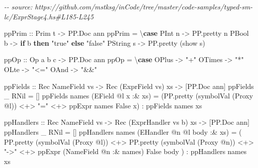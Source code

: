 \documentclass[]{article}
\newenvironment{Shaded}{}{}
\newcommand{\CommentTok}[1]{\textcolor[rgb]{0.38,0.63,0.69}{\textit{#1}}}
\newcommand{\DataTypeTok}[1]{\textcolor[rgb]{0.56,0.13,0.00}{#1}}
\newcommand{\FunctionTok}[1]{\textcolor[rgb]{0.02,0.16,0.49}{#1}}
\newcommand{\KeywordTok}[1]{\textcolor[rgb]{0.00,0.44,0.13}{\textbf{#1}}}
\newcommand{\NormalTok}[1]{#1}
\newcommand{\OperatorTok}[1]{\textcolor[rgb]{0.40,0.40,0.40}{#1}}
\newcommand{\OtherTok}[1]{\textcolor[rgb]{0.00,0.44,0.13}{#1}}
\newcommand{\StringTok}[1]{\textcolor[rgb]{0.25,0.44,0.63}{#1}}
\begin{document}
\begin{Shaded}
\begin{Highlighting}[]
\CommentTok{{-}{-} source: https://github.com/mstksg/inCode/tree/master/code{-}samples/typed{-}sm{-}lc/ExprStage4.hs\#L185{-}L245}

\OtherTok{ppPrim ::} \DataTypeTok{Prim}\NormalTok{ t }\OtherTok{{-}\textgreater{}} \DataTypeTok{PP.Doc}\NormalTok{ ann}
\NormalTok{ppPrim }\OtherTok{=}\NormalTok{ \textbackslash{}}\KeywordTok{case}
  \DataTypeTok{PInt}\NormalTok{ n }\OtherTok{{-}\textgreater{}}\NormalTok{ PP.pretty n}
  \DataTypeTok{PBool}\NormalTok{ b }\OtherTok{{-}\textgreater{}} \KeywordTok{if}\NormalTok{ b }\KeywordTok{then} \StringTok{"true"} \KeywordTok{else} \StringTok{"false"}
  \DataTypeTok{PString}\NormalTok{ s }\OtherTok{{-}\textgreater{}}\NormalTok{ PP.pretty (}\FunctionTok{show}\NormalTok{ s)}

\OtherTok{ppOp ::} \DataTypeTok{Op}\NormalTok{ a b c }\OtherTok{{-}\textgreater{}} \DataTypeTok{PP.Doc}\NormalTok{ ann}
\NormalTok{ppOp }\OtherTok{=}\NormalTok{ \textbackslash{}}\KeywordTok{case}
  \DataTypeTok{OPlus} \OtherTok{{-}\textgreater{}} \StringTok{"+"}
  \DataTypeTok{OTimes} \OtherTok{{-}\textgreater{}} \StringTok{"*"}
  \DataTypeTok{OLte} \OtherTok{{-}\textgreater{}} \StringTok{"\textless{}="}
  \DataTypeTok{OAnd} \OtherTok{{-}\textgreater{}} \StringTok{"\&\&"}

\OtherTok{ppFields ::} \DataTypeTok{Rec} \DataTypeTok{NameField}\NormalTok{ vs }\OtherTok{{-}\textgreater{}} \DataTypeTok{Rec}\NormalTok{ (}\DataTypeTok{ExprField}\NormalTok{ vs) xs }\OtherTok{{-}\textgreater{}}\NormalTok{ [}\DataTypeTok{PP.Doc}\NormalTok{ ann]}
\NormalTok{ppFields \_ }\DataTypeTok{RNil} \OtherTok{=}\NormalTok{ []}
\NormalTok{ppFields names (}\DataTypeTok{EField} \OperatorTok{@}\NormalTok{l x }\OperatorTok{:\&}\NormalTok{ xs) }\OtherTok{=}
\NormalTok{  (PP.pretty (symbolVal (}\DataTypeTok{Proxy} \OperatorTok{@}\NormalTok{l)) }\OperatorTok{\textless{}+\textgreater{}} \StringTok{"="} \OperatorTok{\textless{}+\textgreater{}}\NormalTok{ ppExpr names }\DataTypeTok{False}\NormalTok{ x) }\OperatorTok{:}\NormalTok{ ppFields names xs}

\OtherTok{ppHandlers ::} \DataTypeTok{Rec} \DataTypeTok{NameField}\NormalTok{ vs }\OtherTok{{-}\textgreater{}} \DataTypeTok{Rec}\NormalTok{ (}\DataTypeTok{ExprHandler}\NormalTok{ vs b) xs }\OtherTok{{-}\textgreater{}}\NormalTok{ [}\DataTypeTok{PP.Doc}\NormalTok{ ann]}
\NormalTok{ppHandlers \_ }\DataTypeTok{RNil} \OtherTok{=}\NormalTok{ []}
\NormalTok{ppHandlers names (}\DataTypeTok{EHandler} \OperatorTok{@}\NormalTok{n }\OperatorTok{@}\NormalTok{l body }\OperatorTok{:\&}\NormalTok{ xs) }\OtherTok{=}
\NormalTok{  ( PP.pretty (symbolVal (}\DataTypeTok{Proxy} \OperatorTok{@}\NormalTok{l))}
      \OperatorTok{\textless{}+\textgreater{}}\NormalTok{ PP.pretty (symbolVal (}\DataTypeTok{Proxy} \OperatorTok{@}\NormalTok{n))}
      \OperatorTok{\textless{}+\textgreater{}} \StringTok{"{-}\textgreater{}"}
      \OperatorTok{\textless{}+\textgreater{}}\NormalTok{ ppExpr (}\DataTypeTok{NameField} \OperatorTok{@}\NormalTok{n }\OperatorTok{:\&}\NormalTok{ names) }\DataTypeTok{False}\NormalTok{ body}
\NormalTok{  )}
    \OperatorTok{:}\NormalTok{ ppHandlers names xs}


\end{Highlighting}
\end{Shaded}
\end{document}
